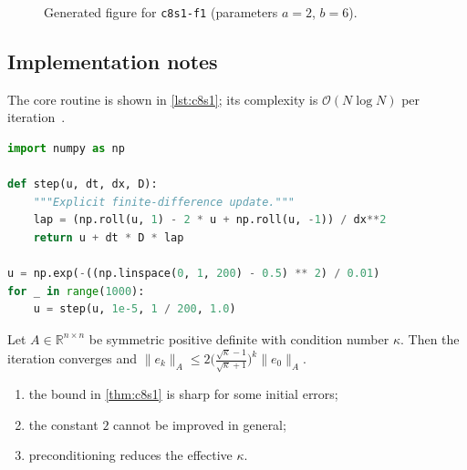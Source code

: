 \begin{figure}[htbp]
\centering
{}
\caption{Generated figure for \texttt{c8s1-f1} (parameters $a=2$, $b=6$).}\label{fig:c8s1-f1}
\end{figure}

\lipsum[101-102]

\subsection{Implementation notes}\label{sec:c8s1-i}
The core routine is shown in \cref{lst:c8s1}; its complexity is $\mathcal{O}(N\log N)$ per iteration~\cite{main-11}.

\begin{lstlisting}[language=python,caption={Reference implementation for c8s1.},label={lst:c8s1}]
import numpy as np

def step(u, dt, dx, D):
    """Explicit finite-difference update."""
    lap = (np.roll(u, 1) - 2 * u + np.roll(u, -1)) / dx**2
    return u + dt * D * lap

u = np.exp(-((np.linspace(0, 1, 200) - 0.5) ** 2) / 0.01)
for _ in range(1000):
    u = step(u, 1e-5, 1 / 200, 1.0)
\end{lstlisting}

\kant[1-12]
\begin{theorem}\label{thm:c8s1}
Let $A\in\mathbb{R}^{n\times n}$ be symmetric positive definite with condition number $\kappa$. Then the iteration converges and
$\lVert e_k\rVert_A \le 2\bigl(\tfrac{\sqrt\kappa-1}{\sqrt\kappa+1}\bigr)^k\lVert e_0\rVert_A$.
\end{theorem}
\begin{enumerate}[label=(\roman*)]
\item the bound in \cref{thm:c8s1} is sharp for some initial errors;
\item the constant $2$ cannot be improved in general;
\item preconditioning reduces the effective $\kappa$.
\end{enumerate}

\lipsum[60-60]
